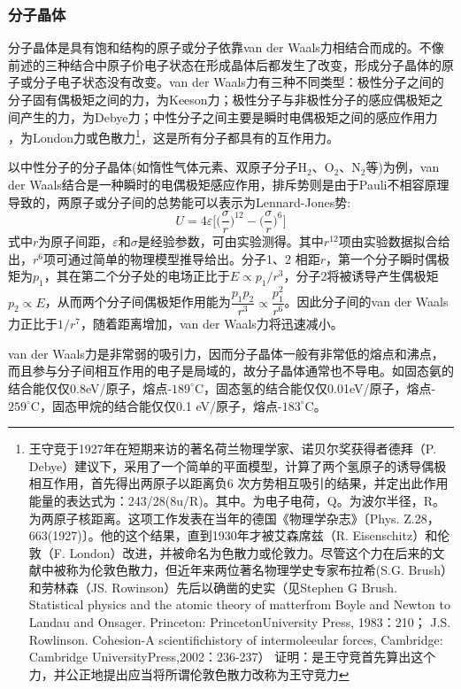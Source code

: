 \subsubsection{分子晶体} 
分子晶体是具有饱和结构的原子或分子依靠van der Waals力相结合而成的。不像前述的三种结合中原子价电子状态在形成晶体后都发生了改变，形成分子晶体的原子或分子电子状态没有改变。van der Waals力有三种不同类型：极性分子之间的分子固有偶极矩之间的力，为Keeson力；极性分子与非极性分子的感应偶极矩之间产生的力，为Debye力；中性分子之间主要是瞬时电偶极矩之间的感应作用力 ，为London力或色散力\footnote{王守竞于1927年在短期来访的著名荷兰物理学家、诺贝尔奖获得者德拜（P. Debye）建议下，采用了一个简单的平面模型，计算了两个氢原子的诱导偶极相互作用，首先得出两原子以距离负6 次方势相互吸引的结果，并定出此作用能量的表达式为：243/28(8u/R)。其中。为电子电荷，Q。为波尔半径，R。为两原子核距离。这项工作发表在当年的德国《物理学杂志》〔Phys. Z.28，663(1927)〕。他的这个结果，直到1930年才被艾森席兹（R. Eisenschitz）和伦敦（F. London）改进，并被命名为色散力或伦敦力。尽管这个力在后来的文献中被称为伦敦色散力，但近年来两位著名物理学史专家布拉希(S.G. Brush）和劳林森（JS. Rowinson）先后以确凿的史实（见Stephen G Brush. Statistical physics and the atomic theory of matterfrom Boyle and Newton to Landau and Onsager. Princeton: PrincetonUniversity Press, 1983：210； J.S. Rowlinson. Cohesion-A scientifichistory of intermoleeular forces, Cambridge: Cambridge UniversityPress,2002：236-237） 证明：是王守竞首先算出这个力，并公正地提出应当将所谓伦敦色散力改称为王守竞力}，这是所有分子都具有的互作用力。

以中性分子的分子晶体(如惰性气体元素、双原子分子$\mathrm{H}_2$、$\mathrm{O}_2$、$\mathrm{N}_2$等)为例，van der Waals结合是一种瞬时的电偶极矩感应作用，排斥势则是由于Pauli不相容原理导致的，两原子或分子间的总势能可以表示为Lennard-Jones势:
\begin{equation}
	U=4\varepsilon\bigg[\big(\dfrac{\sigma}r\big)^{12}-\big(\dfrac{\sigma}r\big)^6\bigg]
	\label{eq:SSI-04}
\end{equation}
式中$r$为原子间距，$\varepsilon$和$\sigma$是经验参数，可由实验测得。其中$r^{12}$项由实验数据拟合给出，$r^6$项可通过简单的物理模型推导给出。分子1、2 相距$r$，第一个分子瞬时偶极矩为$p_1$，其在第二个分子处的电场正比于$E\propto p_1/r^3$，分子2将被诱导产生偶极矩$p_2\propto E$，从而两个分子间偶极矩作用能为$\dfrac{p_1p_2}{r^3}\propto\dfrac{p_1^2}{r^6}$。因此分子间的van der Waals力正比于$1/r^7$，随着距离增加，van der Waals力将迅速减小。

van der Waals力是非常弱的吸引力，因而分子晶体一般有非常低的熔点和沸点，而且参与分子间相互作用的电子是局域的，故分子晶体通常也不导电。如固态氨的结合能仅仅0.8eV/原子，熔点-$189^{\circ}\mathrm{C}$，固态氢的结合能仅仅0.01eV/原子，熔点-$259^{\circ}\mathrm{C}$，固态甲烷的结合能仅仅0.1 eV/原子，熔点-$183^{\circ}\mathrm{C}$。

